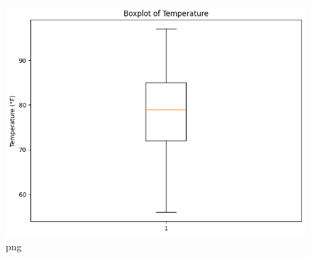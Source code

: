 \documentclass[
  letterpaper,
  DIV=11,
  numbers=noendperiod]{scrreprt}
\newenvironment{Shaded}{\begin{snugshade}}{\end{snugshade}}
\begin{document}
\begin{figure}[H]

{\centering \includegraphics{Tut2_Python_Olufawo_09_21_24_files/Tut2_Python_Olufawo_09_21_24_10_0.png}

}

\caption{png}

\end{figure}%

\begin{Shaded}
\begin{Highlighting}[]

\end{Highlighting}
\end{Shaded}
\end{document}
